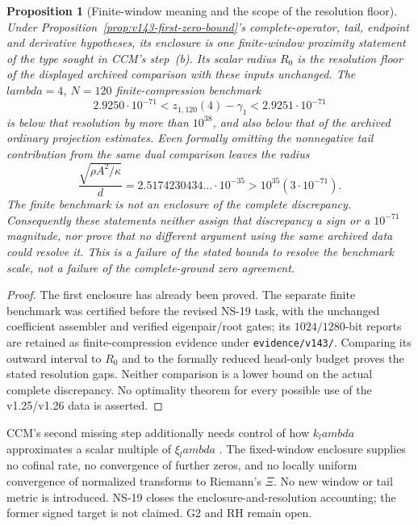 \documentclass[11pt]{article}
\def\lambda{lambda}%
\newtheorem{proposition}[theorem]{Proposition}
\theoremstyle{remark}
\begin{document}
\begin{proposition}[Finite-window meaning and the scope of the resolution floor]
\label{prop:v143-fixed-window-meaning}
Under Proposition~\ref{prop:v143-first-zero-bound}'s complete-operator,
tail, endpoint and derivative hypotheses, its enclosure is one
finite-window proximity statement of the type sought in CCM's
step~(b). Its scalar radius $R_0$ is the resolution floor of the
\emph{displayed archived comparison with these inputs unchanged}.
The $\lambda=4$, $N=120$ finite-compression benchmark
\[
 2.9250\cdot10^{-71}<z_{1,120}(4)-\gamma_1
                         <2.9251\cdot10^{-71}
\]
is below that resolution by more than $10^{38}$, and also below
that of the archived ordinary projection estimates. Even formally
omitting the nonnegative tail contribution from the same dual
comparison leaves the radius
\[
 \frac{\sqrt{\rho A^2/\kappa}}d
 =2.5174230434\ldots\cdot10^{-35}>10^{35}(3\cdot10^{-71}).
\]
The finite benchmark is not an enclosure of the complete discrepancy.
Consequently these statements neither assign that discrepancy a sign
or a $10^{-71}$ magnitude, nor prove that no different argument using
the same archived data could resolve it. This is a failure of the
stated bounds to resolve the benchmark scale, not a failure of the
complete-ground zero agreement.
\end{proposition}
\begin{proof}
The first enclosure has already been proved. The separate finite
benchmark was certified before the revised NS-19 task, with the
unchanged coefficient assembler and verified eigenpair/root gates;
its $1024/1280$-bit reports are retained as finite-compression evidence
under \texttt{evidence/v143/}. Comparing its outward interval to
$R_0$ and to the formally reduced head-only budget proves the
stated resolution gaps. Neither comparison is a lower bound on the
actual complete discrepancy. No optimality theorem for every
possible use of the v1.25/v1.26 data is asserted.
\end{proof}

CCM's second missing step additionally needs control of how
$k_\lambda$ approximates a scalar multiple of $\xi_\lambda$
\cite[Section 8]{ConnesConsaniMoscovici2025}. The fixed-window
enclosure supplies no cofinal rate, no convergence of further zeros,
and no locally uniform convergence of normalized transforms to
Riemann's $\Xi$. No new window or tail metric is introduced.
NS-19 closes the enclosure-and-resolution accounting; the former
signed target is not claimed. G2 and RH remain open.
\end{document}
